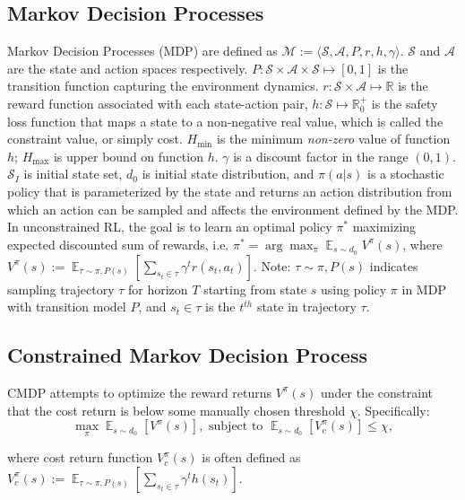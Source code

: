 \documentclass{article}
\theoremstyle{definition}
\DeclareMathOperator*{\E}{\mathbb{E}}
\begin{document}
\subsection{Markov Decision Processes}
\label{section:MDP}
Markov Decision Processes (MDP) are defined as $\mathcal{M}:=\langle \mathcal{S}, \mathcal{A}, P, r, h, \gamma\rangle$. $\mathcal{S}$ and $\mathcal{A}$ are the state and action spaces respectively. $P:\mathcal{S}\times\mathcal{A}\times\mathcal{S}\mapsto[0,1]$ is the transition function capturing the environment dynamics. $r:\mathcal{S}\times\mathcal{A} \mapsto \mathbb{R}$ is the reward function associated with each state-action pair, $h:\mathcal{S}\mapsto \mathbb{R}^+_0$ is the safety loss function that maps a state to a non-negative real value, which is called the constraint value, or simply cost. $H_{\min}$ is the minimum \emph{non-zero} value of function $h$; $H_{\max}$ is upper bound on function $h$. $\gamma$ is a discount factor in the range $(0,1)$. $\mathcal{S}_I$ is initial state set, $d_0$ is initial state distribution, and $\pi(a|s)$ is a stochastic policy that is parameterized by the state and returns an action distribution from which an action can be sampled and affects the environment defined by the MDP. In unconstrained RL, the goal is to learn an optimal policy $\pi^*$ maximizing expected discounted sum of rewards, i.e. $\pi^*=\arg\max_\pi \E_{s\sim d_0} V^\pi (s)$, where $V^\pi(s):=\E_{\tau \sim \pi,P(s)} [\sum_{s_t\in \tau} \gamma^{t} r(s_t,a_t)]$. Note: $\tau \sim \pi,P(s)$ indicates sampling trajectory $\tau$ for horizon $T$ starting from state $s$ using policy $\pi$ in MDP with transition model $P$, and $s_t\in \tau$ is the $t^{th}$ state in trajectory $\tau$. 

\vspace{-5pt}
\subsection{Constrained Markov Decision Process}
CMDP attempts to optimize the reward returns $V^\pi(s)$ under the constraint that the cost return is below some manually chosen threshold $\chi$. Specifically:
\vspace{-5pt}
\begin{equation}
\tag{CMDP}
\label{eqn:CMDP}
    \max_\pi \E_{s\sim d_0}[V^\pi(s)],\text{ subject to }  \E_{s\sim d_0}[V^\pi_c(s)] \leq \chi,
\end{equation}

\vspace{-10pt}
where cost return function $V^\pi_c(s)$ is often defined as $V^\pi_c(s):=\E_{\tau \sim \pi,P(s)} [\sum_{s_t \in \tau} \gamma^t h(s_t)]$. 
\end{document}

